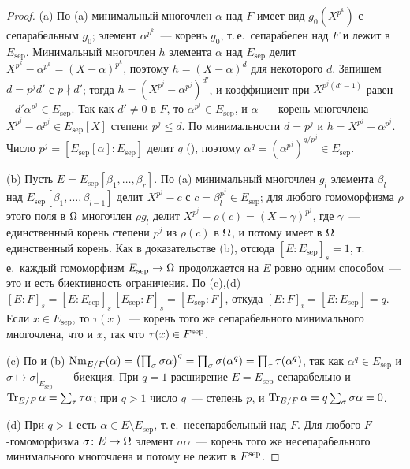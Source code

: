 \begin{proof}
(a) По (a) минимальный многочлен $\alpha$ над $F$ имеет вид $g_0(X^{p^k})$ с сепарабельным $g_0$; элемент
$\alpha^{p^k}$~--- корень $g_0$, т.\,е.\ сепарабелен над $F$ и лежит в $E_{\mathrm{sep}}$. Минимальный многочлен $h$ элемента
$\alpha$ над $E_{\mathrm{sep}}$ делит $X^{p^k}-\alpha^{p^k}=(X-\alpha)^{p^k}$, поэтому $h=(X-\alpha)^d$ для некоторого $d$.
Запишем $d=p^jd'$ с $p\nmid d'$; тогда $h=(X^{p^j}-\alpha^{p^j})^{d'}$, и коэффициент при $X^{p^j(d'-1)}$ равен
$-d'\alpha^{p^j}\in E_{\mathrm{sep}}$. Так как $d'\ne0$ в $F$, то $\alpha^{p^j}\in E_{\mathrm{sep}}$, и $\alpha$~--- корень
многочлена $X^{p^j}-\alpha^{p^j}\in E_{\mathrm{sep}}[X]$ степени $p^j\le d$. По минимальности $d=p^j$ и
$h=X^{p^j}-\alpha^{p^j}$. Число $p^j=[E_{\mathrm{sep}}[\alpha]:E_{\mathrm{sep}}]$ делит $q$ (), поэтому
$\alpha^q=(\alpha^{p^j})^{q/p^j}\in E_{\mathrm{sep}}$.

(b) Пусть $E=E_{\mathrm{sep}}[\beta_1,\dots,\beta_r]$. По (a) минимальный многочлен $g_l$ элемента $\beta_l$ над
$E_{\mathrm{sep}}[\beta_1,\dots,\beta_{l-1}]$ делит $X^{p^{j}}-c$ с $c=\beta_l^{p^j}\in E_{\mathrm{sep}}$; для любого
гомоморфизма $\rho$ этого поля в $\Omega$ многочлен $\rho g_l$ делит $X^{p^j}-\rho(c)=(X-\gamma)^{p^j}$, где $\gamma$~---
единственный корень степени $p^j$ из $\rho(c)$ в $\Omega$, и потому имеет в $\Omega$ единственный корень. Как в доказательстве
(b), отсюда $[E:E_{\mathrm{sep}}]_s=1$, т.\,е.\ каждый гомоморфизм $E_{\mathrm{sep}}\to\Omega$ продолжается на $E$
ровно одним способом~--- это и есть биективность ограничения. По (c),(d)
$[E:F]_s=[E:E_{\mathrm{sep}}]_s\,[E_{\mathrm{sep}}:F]_s=[E_{\mathrm{sep}}:F]$, откуда $[E:F]_i=[E:E_{\mathrm{sep}}]=q$.
Если $x\in E_{\mathrm{sep}}$, то $\tau(x)$~--- корень того же сепарабельного минимального многочлена, что и $x$, так что
$\tau(x)\in F^{\mathrm{sep}}$.

(c) По  и (b) $\operatorname{Nm}_{E/F}(\alpha)=\bigl(\prod_\sigma\sigma\alpha\bigr)^q=\prod_\sigma\sigma(\alpha^q)=
\prod_\tau\tau(\alpha^q)$, так как $\alpha^q\in E_{\mathrm{sep}}$ и $\sigma\mapsto\sigma|_{E_{\mathrm{sep}}}$~--- биекция. При
$q=1$ расширение $E=E_{\mathrm{sep}}$ сепарабельно и $\operatorname{Tr}_{E/F}\alpha=\sum_\tau\tau\alpha$; при $q>1$ число $q$~--- степень
$p$, и $\operatorname{Tr}_{E/F}\alpha=q\sum_\sigma\sigma\alpha=0$.

(d) При $q>1$ есть $\alpha\in E\setminus E_{\mathrm{sep}}$, т.\,е.\ несепарабельный над $F$. Для любого $F$-гомоморфизма
$\sigma\colon E\to\Omega$ элемент $\sigma\alpha$~--- корень того же несепарабельного минимального многочлена и потому не лежит
в $F^{\mathrm{sep}}$.
\end{proof}

